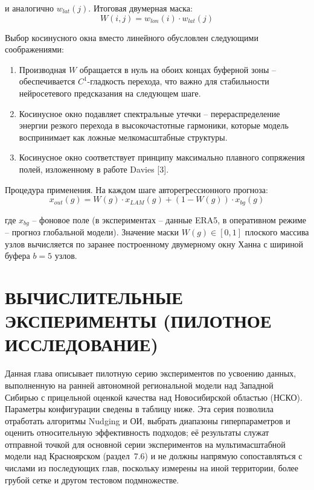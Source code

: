 \documentclass[14pt,a4paper]{extarticle}
\numberwithin{table}{section}
\numberwithin{figure}{section}
\numberwithin{equation}{section}
\begin{document}
и аналогично \(w_{lat}(j)\). Итоговая двумерная маска:
\[W(i, j) = w_{lon}(i) \cdot w_{lat}(j)\]

Выбор косинусного окна вместо линейного обусловлен следующими
соображениями:

\begin{enumerate}
\def\labelenumi{\arabic{enumi}.}
\item Производная \(W\) обращается в нуль на обоих концах буферной
зоны -- обеспечивается \(C^1\)-гладкость перехода, что важно для
стабильности нейросетевого предсказания на следующем шаге.
\item Косинусное окно подавляет спектральные утечки --
перераспределение энергии резкого перехода в
высокочастотные гармоники, которые модель воспринимает
как ложные мелкомасштабные структуры.
\item Косинусное окно соответствует принципу максимально плавного
сопряжения полей, изложенному в работе Davies {[}3{]}.
\end{enumerate}

Процедура применения. На каждом шаге авторегрессионного
прогноза:
\[x_{out}(g) = W(g) \cdot x_{LAM}(g) + (1 - W(g)) \cdot x_{bg}(g)\]

где \(x_{bg}\) -- фоновое поле (в экспериментах -- данные ERA5, в
оперативном режиме -- прогноз глобальной модели). Значение маски
\(W(g) \in [0, 1]\) плоского массива узлов вычисляется по заранее
построенному двумерному окну Ханна с шириной буфера \(b = 5\) узлов.


\newpage

\section{ВЫЧИСЛИТЕЛЬНЫЕ ЭКСПЕРИМЕНТЫ (ПИЛОТНОЕ
ИССЛЕДОВАНИЕ)}\label{ux432ux44bux447ux438ux441ux43bux438ux442ux435ux43bux44cux43dux44bux435-ux44dux43aux441ux43fux435ux440ux438ux43cux435ux43dux442ux44b}

Данная глава описывает пилотную серию экспериментов по усвоению данных,
выполненную на ранней автономной региональной модели над Западной
Сибирью с прицельной оценкой качества над Новосибирской областью
(НСКО). Параметры конфигурации сведены в таблицу ниже. Эта серия
позволила отработать алгоритмы Nudging и ОИ, выбрать диапазоны
гиперпараметров и оценить относительную эффективность подходов; её
результаты служат отправной точкой для основной серии экспериментов на
мультимасштабной модели над Красноярском (раздел~7.6) и не должны
напрямую сопоставляться с числами из последующих глав, поскольку
измерены на иной территории, более грубой сетке и другом тестовом
подмножестве.
\end{document}
